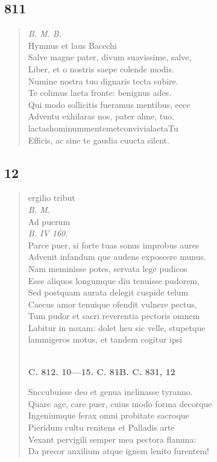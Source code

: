 \documentclass[11pt, a4paper]{report}
\begin{document}
            \subsection*{811}
      \begin{verse}
      \textit{B. M. B.} \\ Hymnus et laus Bacechi \\ Salve magne pater, divum suavissime, salve, \\ Liber, et o nostris saepe colende modis. \\ Numine nostra tuo dignaris tecta subire. \\ Te colimus laeta fronte: benignus ades. \\ Qui modo sollicitis fueramus mentibus, eece \\ Adventu exhilaras nos, pater alme, tuo. \\ lactashominummentemetconvivialaetaTu \\ Efficis, ac sine te gaudia cuucta silent. \\ 
      \end{verse}
  
            \subsection*{12}
      \begin{verse}
      ergilio tribut \\ \textit{B. M.} \\ Ad puerum \\ \textit{B. IV 160.} \\ Parce puer, si forte tuas sonus improbus aures \\ Advenit infandum \lbrack que \rbrack  audens exposcere munus. \\ Nam meminisse potes, servata lege pudicos \\ Esse aliquos longumque diu tenuisse pudorem, \\ Sed postquam aurata delegit cuspide telum \\ Caecus amor tenuique ofendit vulnere pectus, \\ Tum pudor et sacri reverentia pectoris omnem \\ Labitur in noxam: dolet heu sic velle, stupetque \\ lammigeros motus, et tandem cogitur ipsi \\ 
        ﻿\pagebreak 
     \marginpar{[300]} \begin{center} \textbf{C. 812. 10—15. C. 81B. C. 831, 12} \end{center}Snccubuisse deo et genua inclinasse tyranno. \\ Quare age, care puer, cuius modo forma decorque \\ Ingeniumque ferax omni probitate sacroque \\ Pieridum cultu renitens et Palladis arte \\ Vexant pervigili semper mea pectora flamma: \\ Da precor anxilium atque ignem lenito furentem! \\ 
      \end{verse}
  
\end{document}
